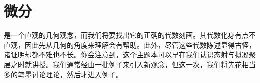 
\chapter{微分}
\label{ch:differentials}

\trDifferential{}是一个直观的几何观念，而我们将要找出它的正确的代数刻画。其代数化身有点不直观，因此先从几何的角度来理解\trDifferential{}会有帮助。此外，尽管这些代数陈述显得古怪，诸证明却都不难也不长。你会注意到，这个主题本可以早在我们认识态射与拟凝聚层之时就讲授。我们通常经由一批例子来引入新观念，但这一次，我们将先花相当多的笔墨讨论理论，然后才进入例子。









